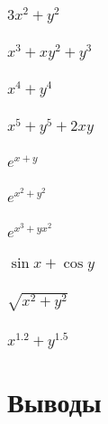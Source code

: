 \subsubsection{$3x^2+y^2$}

\subsubsection{$x^3+xy^2+y^3$}

\subsubsection{$x^4+y^4$}

\subsubsection{$x^5+y^5+2xy$}

\subsubsection{$e^{x+y}$}

\subsubsection{$e^{x^2+y^2}$}

\subsubsection{$e^{x^3+yx^2}$}

\subsubsection{$\sin x+\cos y$}

\subsubsection{$\sqrt{x^2+y^2}$}

\subsubsection{$x^{1.2}+y^{1.5}$}

\section{Выводы}

